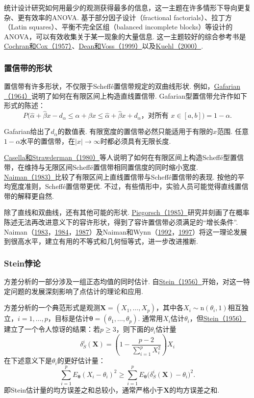 统计设计研究如何用最少的观测获得最多的信息，这一主题在许多情形下导向更复杂、更有效率的ANOVA. 基于部分因子设计（fractional factorials）、拉丁方（Latin squares）、平衡不完全区组（balanced incomplete blocks）等设计的ANOVA，可以有效收集关于某一现象的大量信息. 这一主题较好的综合参考书是\hyperref[bib:source82]{Cochran和Cox（1957）}、\hyperref[bib:source94]{Dean和Voss（1999）}以及\hyperref[bib:source192]{Kuehl（2000）}.

\subsubsection{置信带的形状}\label{sec:11.5.5}
置信带有许多形状，不仅限于Scheff\'e置信带规定的双曲线形状. 例如，\hyperref[bib:source131]{Gafarian（1964）}说明了如何在有限区间上构造直线置信带. Gafarian型置信带允许作如下形式的陈述：
$$P\bigl(\hat\alpha+\hat\beta x-d_\alpha\le\alpha+\beta x\le\hat\alpha+\hat\beta x+d_\alpha
\text{，对所有 }x\in[a,b]\bigr)=1-\alpha.$$

Gafarian给出了$d_\alpha$的数值表. 有限宽度的置信带必然只能适用于有限的$x$范围. 任意$1-\alpha$水平的置信带，在$|x|\to\infty$时都必须具有无限长度.

\hyperref[bib:source71]{Casella和Strawderman（1980）}等人说明了如何在有限区间上构造Scheff\'e型置信带，在维持与无限区间Scheff\'e置信带相同置信度的同时缩小宽度. \hyperref[bib:source227]{Naiman（1983）}比较了有限区间上直线置信带与Scheff\'e置信带的表现. 按他的平均宽度准则，Scheff\'e置信带更优. 不过，有些情形中，实验人员可能觉得直线置信带的解释更自然.

除了直线和双曲线，还有其他可能的形状. \hyperref[bib:source241]{Piegorsch（1985）}研究并刻画了在概率陈述无法再改进意义下的容许形状，得到了容许置信带必须满足的“增长条件”. Naiman（\hyperref[bib:source227]{1983}，\hyperref[bib:source228]{1984}，\hyperref[bib:source229]{1987}）及Naiman和Wynn（\hyperref[bib:source230]{1992}，\hyperref[bib:source231]{1997}）将这一理论发展到很高水平，建立有用的不等式和几何恒等式，进一步改进推断.

\subsubsection{Stein悖论}\label{sec:11.5.6}
方差分析的一部分涉及一组正态均值的同时估计. 自\hyperref[bib:source301]{Stein（1956）}开始，对这一特定问题的发展深刻影响了点估计的理论和应用.

方差分析的一个典范形式是观测$\boldsymbol X=(X_1,\ldots,X_p)$，其中各$X_i\sim\mathrm n(\theta_i,1)$相互独立，$i=1,\ldots,p$，目标是估计$\boldsymbol\theta=(\theta_1,\ldots,\theta_p)$. 通常用$X_i$估计$\theta_i$，但\hyperref[bib:source301]{Stein（1956）}建立了一个令人惊讶的结果：若$p\ge3$，则下面的$\theta_i$估计量
$$\delta_S^i(\boldsymbol X)=\left(1-\frac{p-2}{\sum_{i=1}^pX_i^2}\right)X_i$$
在下述意义下是$\theta_i$的更好估计量：
$$\sum_{i=1}^pE_{\boldsymbol\theta}(X_i-\theta_i)^2
\ge\sum_{i=1}^pE_{\boldsymbol\theta}\bigl(\delta_S^i(\boldsymbol X)-\theta_i\bigr)^2.$$
即Stein估计量的均方误差之和总较小，通常严格小于$\boldsymbol X$的均方误差之和.

